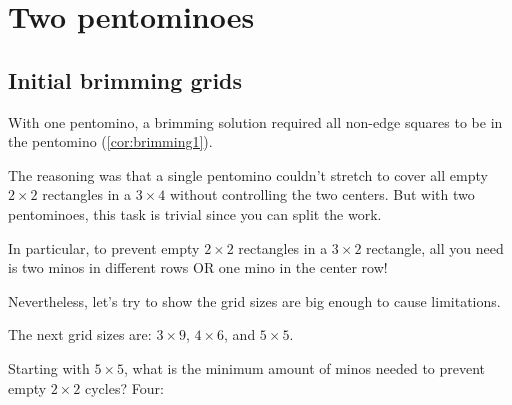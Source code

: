 \documentclass{article}
\theoremstyle{definition}%
\begin{document}
\clearpage
\section{Two pentominoes}

\subsection{Initial brimming grids}

With one pentomino, a brimming solution required all non-edge squares
to be in the pentomino (\cref{cor:brimming1}).

The reasoning was that a single pentomino couldn't stretch to cover all
empty $2 \times 2$ rectangles in a $3 \times 4$ without controlling the two
centers. But with two pentominoes, this task is trivial since you can split the work.

In particular, to prevent empty $2 \times 2$ rectangles in a $3 \times 2$ rectangle,
all you need is two minos in different rows OR one mino in the center row!

Nevertheless, let's try to show the grid sizes are big enough to cause limitations.

The next grid sizes are: $3 \times 9$, $4 \times 6$, and $5 \times 5$.

Starting with $5 \times 5$, what is the minimum amount of minos needed to prevent
empty $2 \times 2$ cycles? Four:
\begin{center}
\end{center}
\end{document}
